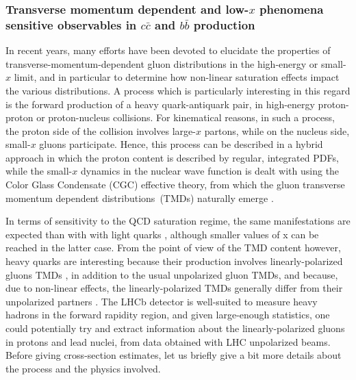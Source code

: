 \documentclass[../report.tex]{subfiles}
\begin{document}
\subsubsection{Transverse momentum dependent and low-$x$ phenomena sensitive observables in $c\bar{c}$ and $b\bar{b}$ production }
\label{sec:cgctmd}

In recent years, many efforts have been devoted to elucidate the properties of transverse-momentum-dependent gluon distributions in the high-energy or small-$x$ limit, and in particular to determine how non-linear saturation effects impact the various distributions. A process which is particularly interesting in this regard is the forward production of a heavy quark-antiquark pair, in high-energy proton-proton or proton-nucleus collisions. For kinematical reasons, in such a process, the proton side of the collision involves large-$x$ partons, while on the nucleus side, small-$x$ gluons participate. Hence, this process can be described in a hybrid approach in which the proton content is described by regular, integrated PDFs, while the small-$x$ dynamics in the nuclear wave function is dealt with using the Color Glass Condensate (CGC) effective theory, from which the gluon transverse momentum dependent distributions~(TMDs)  naturally emerge \cite{Dominguez:2011wm,Marquet:2016cgx}.

In terms of sensitivity to the QCD saturation regime, the same manifestations are expected than with with light quarks \cite{Albacete:2018ruq}, although smaller values of x can be reached in the latter case. From the point of view of the TMD content however, heavy quarks are interesting because their production involves linearly-polarized gluons TMDs \cite{Akcakaya:2012si}, in addition to the usual unpolarized gluon TMDs, and because, due to non-linear effects, the linearly-polarized TMDs generally differ from their unpolarized partners \cite{Marquet:2017xwy}. The LHCb detector is well-suited to measure heavy hadrons in the forward rapidity region, and given large-enough statistics, one could potentially try and extract information about the linearly-polarized gluons in protons and lead nuclei, from data obtained with LHC unpolarized beams. Before giving cross-section estimates, let us briefly give a bit more details about the process and the physics involved.
\end{document}
